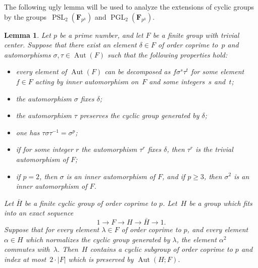\documentclass[12pt]{amsart}
\numberwithin{equation}{section}
\newtheorem{lemma}[subsection]{Lemma}
\theoremstyle{definition}
\DeclareMathOperator{\Aut}{Aut}
\DeclareMathOperator{\PGL}{PGL}
\DeclareMathOperator{\PSL}{PSL}
\def \ge {\geqslant}
\begin{document}
The following ugly lemma will be used to analyze the extensions of cyclic groups
by the groups~\mbox{$\PSL_2(\mathbf{F}_{p^k})$}
and $\PGL_2(\mathbf{F}_{p^k})$.

\begin{lemma}\label{lemma:PSL-group-extension}
Let $p$ be a prime number, and let $F$ be a finite group with trivial
center. Suppose that
there exist an element $\delta\in F$ of order coprime to~$p$ and automorphisms $\sigma, \tau\in\Aut(F)$ such that the following properties hold:
\begin{itemize}
\item
every element of $\Aut(F)$ can be decomposed
as $f\sigma^s\tau^t$ for some element~\mbox{$f\in F$} acting by inner automorphism on~$F$ and some integers~$s$ and~$t$;

\item the automorphism $\sigma$ fixes $\delta$;

\item  the automorphism $\tau$ preserves the cyclic group generated by $\delta$;

\item one has $\tau\sigma\tau^{-1}=\sigma^p$;

\item if for some integer $r$ the automorphism $\tau^r$ fixes $\delta$, then
$\tau^r$ is the trivial automorphism of $F$;

\item if $p=2$, then $\sigma$ is an inner automorphism of $F$,
and if $p\ge 3$, then $\sigma^2$ is an inner automorphism of $F$.
\end{itemize}
Let $\bar{H}$ be a finite cyclic group of order coprime to $p$.
Let~$H$ be a group which fits into an exact sequence
$$
1\to F\to H\to \bar{H}\to 1.
$$
Suppose that for every element
$\lambda\in F$ of order coprime to $p$, and every element~\mbox{$\alpha\in H$}
which normalizes the cyclic group generated by $\lambda$, the element $\alpha^2$
commutes with~$\lambda$.
Then~$H$ contains a cyclic subgroup of order coprime to $p$ and index at
most~$2\cdot |F|$ which is preserved by $\Aut(H;F)$.
\end{lemma}
\end{document}
